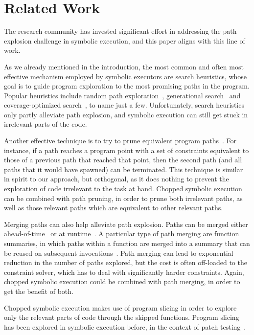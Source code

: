 
\section{Related Work}\label{text:related}

The research community has invested significant effort in addressing
the path explosion challenge in symbolic execution, and this paper
aligns with this line of work.

As we already mentioned in the introduction, the most common and often
most effective mechanism employed by symbolic executors are search
heuristics, whose goal is to guide program exploration to the most
promising paths in the program.  Popular heuristics include random
path exploration~\cite{klee}, generational search~\cite{sage} and
coverage-optimized search~\cite{exe,sen:concolicheuristics}, to name
just a few.  Unfortunately, search heuristics only partly alleviate
path explosion, and symbolic execution can still get stuck in
irrelevant parts of the code.

Another effective technique is to try to prune equivalent program
paths~\cite{exe:tacas,rwset2}.  For instance, if a path reaches a
program point with a set of constraints equivalent to those of a
previous path that reached that point, then the second path (and all
paths that it would have spawned) can be terminated.  This technique
is similar in spirit to our approach, but orthogonal, as it does
nothing to prevent the exploration of code irrelevant to the task at
hand.  Chopped symbolic execution can be combined with path pruning,
in order to prune both irrelevant paths, as well as those relevant
paths which are equivalent to other relevant paths.

Merging paths can also help alleviate path explosion.  Paths can be
merged either ahead-of-time~\cite{klee-fp,kleecl:tse} or at
runtime~\cite{merging:pldi12,multise:fse15}. A particular type of path
merging are function summaries, in which paths within a function are
merged into a summary that can be reused on subsequent
invocations~\cite{godefroid:popl,godefroid:tacas}. Path merging can
lead to exponential reduction in the number of paths explored, but the
cost is often off-loaded to the constraint solver, which has to deal
with significantly harder constraints.  Again, chopped symbolic
execution could be combined with path merging, in order to get the
benefit of both.

Chopped symbolic execution makes use of program slicing in order to
explore only the relevant parts of code through the skipped functions.
Program slicing has been explored in symbolic execution before, \eg in
the context of patch testing~\cite{babic11}.


